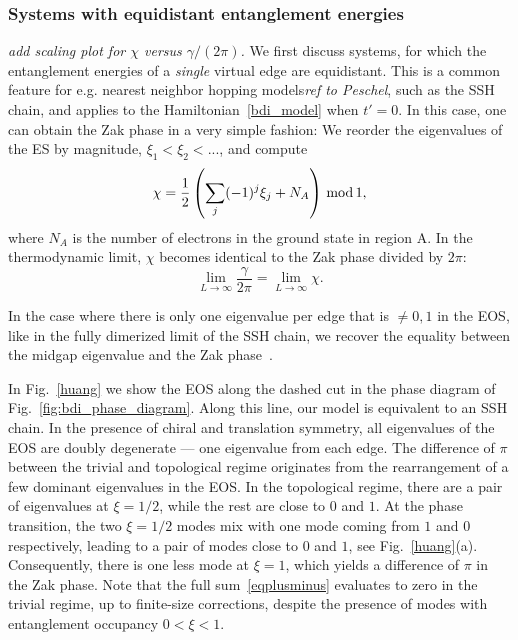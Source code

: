 \documentclass[twocolumn,amsmath,longbibliography,amssymb,superscriptaddress]{revtex4-1}
\newcommand{\mariac}[1]{{\it\color{cyan}#1}}
\begin{document}
\subsubsection{Systems with equidistant entanglement energies}
\mariac{add scaling plot for $\chi$ versus $\gamma/(2\pi)$. }
We first discuss systems, for which the entanglement energies of a \emph{single} virtual edge are equidistant. 
This is a common feature for e.g. nearest neighbor hopping models\mariac{ref to Peschel}, such as the SSH chain, and applies to the Hamiltonian~\eqref{bdi_model} when $t'=0$. 
In this case, one can obtain the Zak phase in a very simple fashion: We reorder the eigenvalues of the ES by magnitude, $\xi_1 < \xi_2 < ...$, and compute
\begin{equation}
\chi = \frac{1}{2}\left(\sum_j (-1)^j \xi_j+N_A\right) \, {\rm mod} \, 1,
\label{eqplusminus}
\end{equation}
where $N_A$ is the number of electrons in the ground state in region A. 
In the thermodynamic limit, $\chi$ becomes identical to the Zak phase divided by $2\pi$:
\begin{equation}
\lim_{L \rightarrow \infty} \frac{\gamma}{2\pi} = \lim_{L \rightarrow \infty} \chi.
\end{equation}

In the case where there is only one eigenvalue per edge that is $\neq 0,1$ in  the EOS, like in the fully dimerized limit of the SSH chain, we recover the equality between the midgap eigenvalue and the Zak phase~\cite{Ryu2006}. 

In Fig.~\ref{huang} we show  the EOS along the dashed cut in the phase diagram of Fig.~\ref{fig:bdi_phase_diagram}. 
Along this line, our model is equivalent to an SSH chain. 
In the presence of chiral and translation symmetry, all eigenvalues of the EOS are doubly degenerate --- one eigenvalue from each edge. 
The difference of $\pi$ between the trivial and topological regime originates from the rearrangement of a few dominant eigenvalues in the EOS. 
In the topological regime, there are a pair of eigenvalues at $\xi=1/2$, while the rest are close to $0$ and $1$. 
At the phase transition, the two $\xi=1/2$ modes mix with one mode coming from $1$ and $0$ respectively, leading to a pair of modes close to $0$ and $1$, see Fig.~\ref{huang}(a). 
Consequently, there is one less mode at $\xi=1$, which yields a difference of $\pi$ in the Zak phase. 
Note that the full sum~\eqref{eqplusminus}  evaluates to zero in the trivial regime, up to finite-size corrections, despite the presence of modes with entanglement occupancy $0<\xi<1$. 
\end{document}
